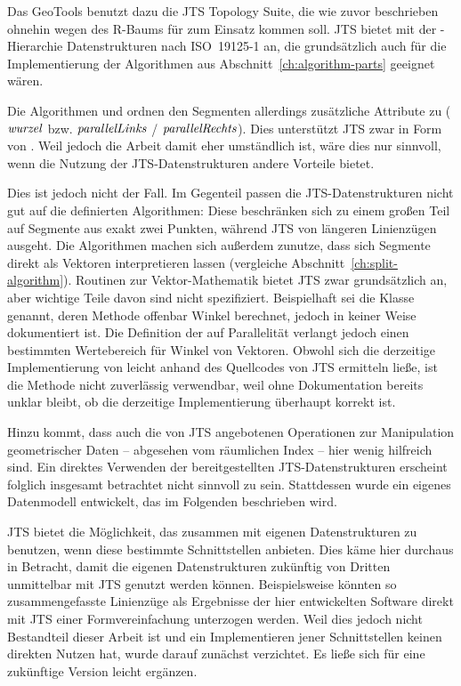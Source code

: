 \documentclass[../main/thesis.tex]{subfiles}
\begin{document}
\noindent
Das  GeoTools benutzt dazu die JTS Topology Suite, die wie zuvor beschrieben ohnehin wegen des R-Baums für  zum Einsatz kommen soll.
JTS bietet mit der -Hierarchie Datenstrukturen nach ISO~19125\hbox{-}1 an, die grundsätzlich auch für die Implementierung der Algorithmen aus Abschnitt~\ref{ch:algorithm-parts} geeignet wären.

Die Algorithmen  und  ordnen den Segmenten allerdings zusätzliche Attribute zu ($\relation{wurzel}$ bzw. $\relation{parallelLinks}$ / $\relation{parallelRechts}$).
Dies unterstützt JTS zwar in Form von .
Weil jedoch die Arbeit damit eher umständlich ist, wäre dies nur sinnvoll, wenn die Nutzung der JTS-Datenstrukturen andere Vorteile bietet.

Dies ist jedoch nicht der Fall.
Im Gegenteil passen die JTS-Datenstrukturen nicht gut auf die definierten Algorithmen:
Diese beschränken sich zu einem großen Teil auf Segmente aus exakt zwei Punkten, während JTS von längeren Linienzügen ausgeht.
Die Algorithmen machen sich außerdem zunutze, dass sich Segmente direkt als Vektoren interpretieren lassen (vergleiche Abschnitt~\ref{ch:split-algorithm}).
Routinen zur Vektor-Mathematik bietet JTS zwar grundsätzlich an, aber wichtige Teile davon sind nicht spezifiziert.
Beispielhaft sei die Klasse  genannt, deren Methode  offenbar Winkel berechnet, jedoch in keiner Weise dokumentiert ist.
Die Definition der  auf Parallelität verlangt jedoch einen bestimmten Wertebereich für Winkel von Vektoren.
Obwohl sich die derzeitige Implementierung von  leicht anhand des Quellcodes von JTS ermitteln ließe, ist die Methode nicht zuverlässig verwendbar, weil ohne Dokumentation bereits unklar bleibt, ob die derzeitige Implementierung überhaupt korrekt ist.

Hinzu kommt, dass auch die von JTS angebotenen Operationen zur Manipulation geometrischer Daten -- abgesehen vom räumlichen Index -- hier wenig hilfreich sind.
Ein direktes Verwenden der bereitgestellten JTS-Datenstrukturen erscheint folglich insgesamt betrachtet nicht sinnvoll zu sein.
Stattdessen wurde ein eigenes Datenmodell entwickelt, das im Folgenden beschrieben wird.

JTS bietet die Möglichkeit, das  zusammen mit eigenen Datenstrukturen zu benutzen, wenn diese bestimmte Schnittstellen anbieten.
Dies käme hier durchaus in Betracht, damit die eigenen Datenstrukturen zukünftig von Dritten unmittelbar mit JTS genutzt werden können.
Beispielsweise könnten so zusammengefasste Linienzüge als Ergebnisse der hier entwickelten Software direkt mit JTS einer Formvereinfachung unterzogen werden.
Weil dies jedoch nicht Bestandteil dieser Arbeit ist und ein Implementieren jener Schnittstellen keinen direkten Nutzen hat, wurde darauf zunächst verzichtet.
Es ließe sich für eine zukünftige Version leicht ergänzen.
\end{document}
